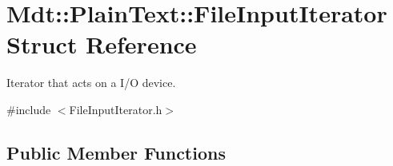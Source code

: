 \hypertarget{struct_mdt_1_1_plain_text_1_1_file_input_iterator}{}\section{Mdt\+:\+:Plain\+Text\+:\+:File\+Input\+Iterator Struct Reference}
\label{struct_mdt_1_1_plain_text_1_1_file_input_iterator}


Iterator that acts on a I/O device.  




{\ttfamily \#include $<$File\+Input\+Iterator.\+h$>$}

\subsection*{Public Member Functions}
